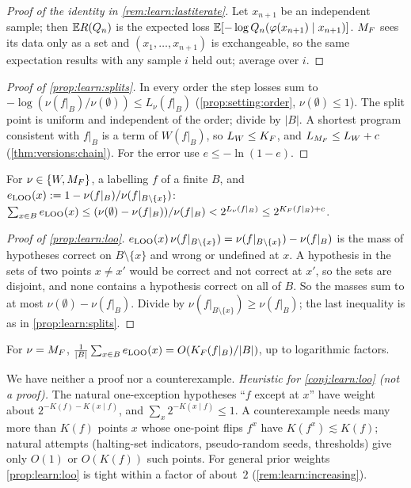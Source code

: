 \begin{proof}[Proof of the identity in \cref{rem:learn:lastiterate}]
Let $x_{n+1}$ be an independent sample; then $\mathbb{E} R(Q_n)$ is the expected loss $\mathbb{E}[-\log Q_n(\varphi(x_{n+1})\mid x_{n+1})]$. $M_{F}$ sees its data only as a set and $(x_1,\dots,x_{n+1})$ is exchangeable, so the same expectation results with any sample $i$ held out; average over $i$.
\end{proof}

\begin{proof}[Proof of \cref{prop:learn:splits}]
In every order the step losses sum to $-\log(\nu(f|_B)/\nu(\emptyset))\le L_\nu(f|_B)$ (\cref{prop:setting:order}, $\nu(\emptyset)\le1$). The split point is uniform and independent of the order; divide by $|B|$. A shortest program consistent with $f|_B$ is a term of $W(f|_B)$, so $L_W\le K_{F}$, and $L_{M_{F}}\le L_W+c$ (\cref{thm:versions:chain}). For the error use $e\le-\ln(1-e)$.
\end{proof}

\begin{proposition}\label{prop:learn:loo}
For $\nu\in\{W,M_{F}\}$, a labelling $f$ of a finite $B$, and $e_{\rm LOO}(x):=1-\nu(f|_B)/\nu(f|_{B\setminus\{x\}})$: $\sum_{x\in B}e_{\rm LOO}(x)\le(\nu(\emptyset)-\nu(f|_B))/\nu(f|_B)<2^{L_\nu(f|_B)}\le2^{K_{F}(f|_B)+c}$.
\end{proposition}

\begin{proof}[Proof of \cref{prop:learn:loo}]
$e_{\rm LOO}(x)\,\nu(f|_{B\setminus\{x\}})=\nu(f|_{B\setminus\{x\}})-\nu(f|_B)$ is the mass of hypotheses correct on $B\setminus\{x\}$ and wrong or undefined at $x$. A hypothesis in the sets of two points $x\ne x'$ would be correct and not correct at $x'$, so the sets are disjoint, and none contains a hypothesis correct on all of $B$. So the masses sum to at most $\nu(\emptyset)-\nu(f|_B)$. Divide by $\nu(f|_{B\setminus\{x\}})\ge\nu(f|_B)$; the last inequality is as in \cref{prop:learn:splits}.
\end{proof}

\begin{conjecture}\label{conj:learn:loo}
For $\nu=M_{F}$, $\frac1{|B|}\sum_{x\in B}e_{\rm LOO}(x)=O(K_{F}(f|_B)/|B|)$, up to logarithmic factors.
\end{conjecture}

We have neither a proof nor a counterexample.
\emph{Heuristic for \cref{conj:learn:loo} (not a proof).} The natural one-exception hypotheses ``$f$ except at $x$'' have weight about $2^{-K(f)-K(x\mid f)}$, and $\sum_x2^{-K(x\mid f)}\le1$. A counterexample needs many more than $K(f)$ points $x$ whose one-point flips $f^x$ have $K(f^x)\lesssim K(f)$; natural attempts (halting-set indicators, pseudo-random seeds, thresholds) give only $O(1)$ or $O(K(f))$ such points. For general prior weights \cref{prop:learn:loo} is tight within a factor of about~$2$ (\cref{rem:learn:increasing}).

